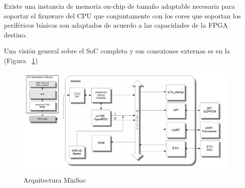 				Existe una instancia de memoria on-chip de tamaño adaptable necesaria para soportar el firmware del CPU que conjuntamente con los cores que
				soportan los periféricos básicos son adaptados de acuerdo a las capacidades de la FPGA destino. 

Una visión general sobre el SoC completa y sus conexiones externas es en la  (Figura ~\ref{fig:esquemaminsoc})

\begin{figure}[h!]
 \begin{center}
  \includegraphics[width=1\textwidth,keepaspectratio=true]{./images/minsoc}
  \caption{Arquitectura MinSoc}
  \label{fig:esquemaminsoc}
 \end{center}
\end{figure}

